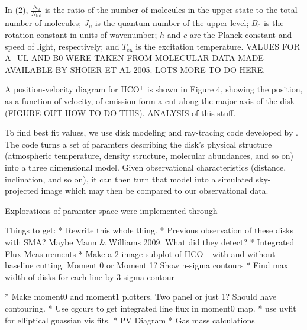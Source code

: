 In (2), $\frac{N_u}{N_{\text{tot}}}$ is the ratio of the number of molecules in the upper state to the total number of molecules; $J_u$ is the quantum number of the upper level; $B_0$ is the rotation constant in units of wavenumber; $h$ and $c$ are the Planck constant and speed of light, respectively; and $T_{\text{ex}}$ is the excitation temperature. VALUES FOR A_UL AND B0 WERE TAKEN FROM MOLECULAR DATA MADE AVAILABLE BY SHOIER ET AL 2005. LOTS MORE TO DO HERE.


A position-velocity diagram for HCO$^{+}$ is shown in Figure 4, showing the position, as a function of velocity, of emission form a cut along the major axis of the disk (FIGURE OUT HOW TO DO THIS).
ANALYSIS of this stuff.




To find best fit values, we use disk modeling and ray-tracing code developed by \citet{flaherty2013}. The code turns a set of paramters describing the disk's physical structure (atmospheric temperature, density structure, molecular abundances, and so on) into a three dimensional model. Given observational characteristics (distance, inclination, and so on), it can then turn that model into a simulated sky-projected image which may then be compared to our observational data.

Explorations of paramter space were implemented through



Things to get:
* Rewrite this whole thing.
* Previous observation of these disks with SMA? Maybe Mann & Williams 2009. What did they detect?
* Integrated Flux Measurements
* Make a 2-image subplot of HCO+ with and without baseline cutting. Moment 0 or Moment 1? Show n-sigma contours
  * Find max width of disks for each line by 3-sigma contour

* Make moment0 and moment1 plotters. Two panel or just 1? Should have contouring.
* Use cgcurs to get integrated line flux in moment0 map.
* use uvfit for elliptical guassian vis fits.
* PV Diagram
* Gas mass calculations





